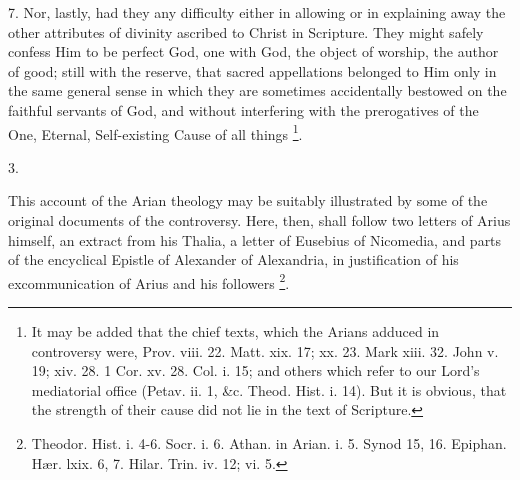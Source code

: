 7. Nor, lastly, had they any difficulty either in allowing or in
explaining away the other attributes of divinity ascribed to Christ in
Scripture. They might safely confess Him to be perfect God, one
with God, the object of worship, the author of good; still with the
reserve, that sacred appellations belonged to Him only in the same
general sense in which they are sometimes accidentally bestowed on the
faithful servants of God, and without interfering with the
prerogatives of the One, Eternal, Self-existing Cause of all things \footnote{It may be added that the chief texts,
which the Arians adduced in controversy were, Prov. viii. 22. Matt.
xix. 17; xx. 23. Mark xiii. 32. John v. 19; xiv. 28. 1 Cor. xv. 28.
Col. i. 15; and others which refer to our Lord's mediatorial office (Petav.
ii. 1, \&c. Theod. Hist. i. 14). But it is obvious, that the
strength of their cause did not lie in the text of Scripture.}.

3.

This account of the Arian theology may be suitably illustrated by
some of the original documents of the controversy. Here, then, shall
follow two letters of Arius himself, an extract from his Thalia, a
letter of Eusebius of Nicomedia, and parts of the encyclical Epistle
of Alexander of Alexandria, in justification of his excommunication of
Arius and his followers \footnote{Theodor. Hist. i. 4-6. Socr. i. 6. Athan.
in Arian. i. 5. Synod 15, 16. Epiphan. Hær. lxix. 6, 7. Hilar. Trin.
iv. 12; vi. 5.}.

